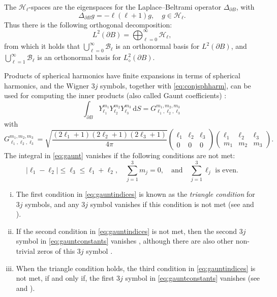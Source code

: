 \documentclass[reqno]{amsart}
\numberwithin{equation}{section}
\numberwithin{figure}{section}
\numberwithin{table}{section}
\theoremstyle{plain}
\theoremstyle{definition}
\theoremstyle{remark}
\newcommand{\abs}[1]{\lvert#1\rvert}
\newcommand{\di}{\mathrm{d}}   %
\begin{document}
The $\mathcal{H}_\ell$-spaces are the eigenspaces for the Laplace–Beltrami operator $\Delta_{\partial B}$, with
%
\begin{equation} \label{eq:LBeig}
    \Delta_{\partial B}g = -\ell(\ell+1)g, \quad g\in\mathcal{H}_\ell.
\end{equation}
%
Thus there is the following orthogonal decomposition:
%
\begin{equation*}
    L^2(\partial B) = \bigoplus_{\ell=0}^\infty \mathcal{H}_\ell,
\end{equation*}
%
from which it holds that $\bigcup_{\ell=0}^\infty \mathcal{B}_\ell$ is an orthonormal basis for $L^2(\partial B)$, and $\bigcup_{\ell=1}^\infty \mathcal{B}_\ell$ is an orthonormal basis for $L^2_\diamond(\partial B)$.

Products of spherical harmonics have finite expansions in terms of spherical harmonics, and the Wigner $3j$ symbols, together with \eqref{eq:conjsphharm}, can be used for computing the inner products (also called Gaunt coefficients) \cite[§34.3(vii) Eq.~34.3.22]{NIST}:
%
\begin{equation} \label{eq:gaunt}
    \int_{\partial B} Y_{\ell_1}^{m_1}Y_{\ell_2}^{m_2}Y_{\ell_3}^{m_3}\,\di S = G_{\ell_1,\ell_2,\ell_3}^{m_1,m_2,m_3}
\end{equation}
%
with
%
\begin{equation} \label{eq:gauntconstants}
    G_{\ell_1,\ell_2,\ell_3}^{m_1,m_2,m_3} = \sqrt{\frac{(2\ell_1+1)(2\ell_2+1)(2\ell_3+1)}{4\pi}}
    \begin{pmatrix}
        \ell_1 & \ell_2 & \ell_3 \\
        0 & 0 & 0
    \end{pmatrix}
    \begin{pmatrix}
        \ell_1 & \ell_2 & \ell_3 \\
        m_1 & m_2 & m_3
    \end{pmatrix}.
\end{equation}
%
The integral in \eqref{eq:gaunt} vanishes if the following conditions are not met:
%
\begin{equation} \label{eq:gauntindices}
    \abs{\ell_1-\ell_2}\leq \ell_3 \leq \ell_1+\ell_2, \quad \sum_{j=1}^3 m_j = 0, \quad \text{and} \quad \sum_{j=1}^3\ell_j \text{ is even}.
\end{equation}
%
\begin{enumerate}[(i)]
    \item The first condition in \eqref{eq:gauntindices} is known as the \emph{triangle condition} for $3j$ symbols, and any $3j$ symbol vanishes if this condition is not met (see \cite[§34.2]{NIST} and \cite[Section~2.1]{Pain2020}).
    \item If the second condition in \eqref{eq:gauntindices} is not met, then the second $3j$ symbol in \eqref{eq:gauntconstants} vanishes \cite[§34.2]{NIST}, although there are also other non-trivial zeros of this $3j$ symbol \cite{Pain2020}.
    \item When the triangle condition holds, the third condition in \eqref{eq:gauntindices} is not met, if and only if, the first $3j$ symbol in \eqref{eq:gauntconstants} vanishes (see \cite[§34.3(i) Eq.~34.3.5]{NIST} and \cite[Eqs.~(47) and~(48)]{Pain2020}).
\end{enumerate}
\end{document}
